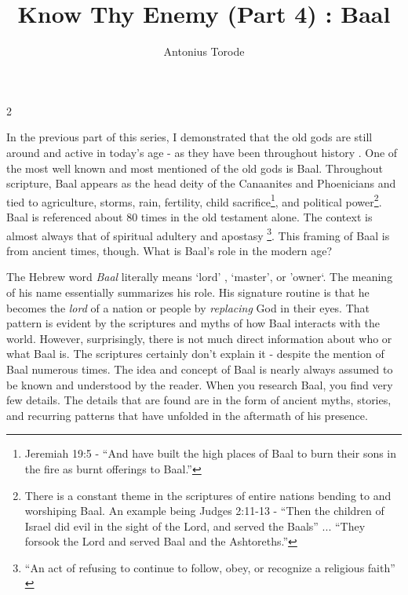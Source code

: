 \documentclass[10pt]{article}
\title{Know Thy Enemy (Part 4) 	: Baal}
\author{Antonius Torode}
\begin{document}
\maketitle
\thispagestyle{fancy}



\begin{multicols}{2}

In the previous part of this series, I demonstrated that the old gods are still around and active in today's age - as they have been throughout history \cite{part3}. One of the most well known and most mentioned of the old gods is Baal. Throughout scripture, Baal appears as the head deity of the Canaanites and Phoenicians and tied to agriculture, storms, rain, fertility, child sacrifice\footnote{Jeremiah 19:5 - ``And have built the high places of Baal to burn their sons in the fire as burnt offerings to Baal.''}, and political power\footnote{There is a constant theme in the scriptures of entire nations bending to and worshiping Baal. An example being Judges 2:11-13 - ``Then the children of Israel did evil in the sight of the Lord, and served the Baals'' ... ``They forsook the Lord and served Baal and the Ashtoreths.''}\cite{baal strongs}. Baal is referenced about 80 times in the old testament alone. The context is almost always that of spiritual adultery and apostasy \footnote{``An act of refusing to continue to follow, obey, or recognize a religious faith'' \cite{apostasy defn}}\cite{baal strongs}. This framing of Baal is from ancient times, though. What is Baal's role in the modern age?

The Hebrew word \textit{Baal} literally means `lord' \cite{Strong's GodRules, indiaTimes}, `master'\cite{baal strongs}, or 'owner`\cite{baal strongs, indiaTimes}. The meaning of his name essentially summarizes his role. His signature routine is that he becomes the \textit{lord} of a nation or people by \textit{replacing} God in their eyes. That pattern is evident by the scriptures and myths of how Baal interacts with the world. However, surprisingly, there is not much direct information about who or what Baal is. The scriptures certainly don't explain it - despite the mention of Baal numerous times. The idea and concept of Baal is nearly always assumed to be known and understood by the reader. When you research Baal, you find very few details. The details that are found are in the form of ancient myths, stories, and recurring patterns that have unfolded in the aftermath of his presence. 


\end{multicols}
\end{document}

